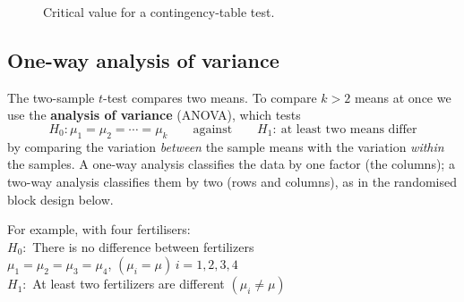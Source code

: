 \documentclass[11pt,a4paper]{article}
\theoremstyle{definition}
\begin{document}
\begin{figure}[H]
\centering
{}
\caption{Critical value for a contingency-table test.}
\end{figure}


















\subsection{One-way analysis of variance}

The two-sample $t$-test compares two means. To compare $k>2$ means at once we use the
\textbf{analysis of variance} (ANOVA), which tests
\[H_0:\mu_1=\mu_2=\cdots=\mu_k\qquad\text{against}\qquad H_1:\ \text{at least two means differ}\]
by comparing the variation \emph{between} the sample means with the variation \emph{within}
the samples. A one-way analysis classifies the data by one factor (the columns); a two-way
analysis classifies them by two (rows and columns), as in the randomised block design below.

For example, with four fertilisers:\\[1ex]
$H_0:$ There is no difference between fertilizers\\ $\mu_1=\mu_2=\mu_3=\mu_4$, $(\mu_i=\mu)\,i=1,2,3,4$\\[1ex]
$H_1:$ At least two fertilizers are different $(\mu_i \neq \mu)$\\[1ex]
\end{document}
